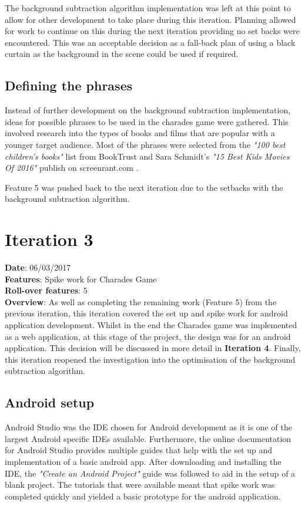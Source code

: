 The background subtraction algorithm implementation was left at this point to allow for other development to take place during this iteration. Planning allowed for work to continue on this during the next iteration providing no set backs were encountered. This was an acceptable decision as a fall-back plan of using a black curtain as the background in the scene could be used if required.

\subsection{Defining the phrases}
Instead of further development on the background subtraction implementation, ideas for possible phrases to be used in the charades game were gathered. This involved research into the types of books and films that are popular with a younger target audience. Most of the phrases were selected from the \textit{"100 best children's books"} list from BookTrust \cite{book_trust} and Sara Schmidt's \textit{"15 Best Kids Movies Of 2016"} publish on screenrant.com \cite{movies_2016}.

Feature 5 was pushed back to the next iteration due to the setbacks with the background subtraction algorithm.

\newpage

\section{Iteration 3}
\textbf{Date}: 06/03/2017 \\
\textbf{Features}: Spike work for Charades Game \\
\textbf{Roll-over features}: 5 \\
\textbf{Overview}: As well as completing the remaining work (Feature 5) from the previous iteration, this iteration covered the set up and spike work for android application development. Whilst in the end the Charades game was implemented as a web application, at this stage of the project, the design was for an android application. This decision will be discussed in more detail in \textbf{Iteration 4}. Finally, this iteration reopened the investigation into the optimisation of the background subtraction algorithm.

\subsection{Android setup}
Android Studio was the IDE chosen for Android development as it is one of the largest Android specific IDEs available. Furthermore, the online documentation for Android Studio provides multiple guides that help with the set up and implementation of a basic android app. After downloading and installing the IDE, the \textit{"Create an Android Project"} guide \cite{create_android_project} was followed to aid in the setup of a blank project. The tutorials that were available meant that spike work was completed quickly and yielded a basic prototype for the android application.

